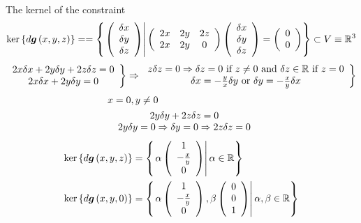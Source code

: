 \documentclass[aps,preprint]{revtex4}%
\begin{document}
The kernel of the constraint
\[
\ker\left\{  d\boldsymbol{g}\left(  x,y,z\right)  \right\}  ==\left\{  \left.
\left(
\begin{array}
[c]{c}%
\delta x\\
\delta y\\
\delta z
\end{array}
\right)  \right\vert \left(
\begin{array}
[c]{ccc}%
2x & 2y & 2z\\
2x & 2y & 0
\end{array}
\right)  \left(
\begin{array}
[c]{c}%
\delta x\\
\delta y\\
\delta z
\end{array}
\right)  =\left(
\begin{array}
[c]{c}%
0\\
0
\end{array}
\right)  \right\}  \subset V\equiv\mathbb{R}^{3}%
\]%
\[
\left.
\begin{array}
[c]{c}%
2x\delta x+2y\delta y+2z\delta z=0\\
2x\delta x+2y\delta y=0
\end{array}
\right\}  \Rightarrow\left.
\begin{array}
[c]{c}%
z\delta z=0\Rightarrow\delta z=0\text{ if }z\neq0\text{ and }\delta
z\in\mathbb{R}\text{ if }z=0\\
\delta x=-\frac{y}{x}\delta y\text{ or }\delta y=-\frac{x}{y}\delta x
\end{array}
\right\}
\]%
\begin{align*}
x  &  =0,y\neq0\\
&
\begin{array}
[c]{c}%
2y\delta y+2z\delta z=0\\
2y\delta y=0\Rightarrow\delta y=0\Rightarrow2z\delta z=0
\end{array}
\end{align*}%
\begin{align*}
\ker\left\{  d\boldsymbol{g}\left(  x,y,z\right)  \right\}   &  =\left\{
\left.  \alpha\left(
\begin{array}
[c]{c}%
1\\
-\frac{x}{y}\\
0
\end{array}
\right)  \right\vert \alpha\in\mathbb{R}\right\} \\
\ker\left\{  d\boldsymbol{g}\left(  x,y,0\right)  \right\}   &  =\left\{
\left.  \alpha\left(
\begin{array}
[c]{c}%
1\\
-\frac{x}{y}\\
0
\end{array}
\right)  ,\beta\left(
\begin{array}
[c]{c}%
0\\
0\\
1
\end{array}
\right)  \right\vert \alpha,\beta\in\mathbb{R}\right\}
\end{align*}%
\end{document}
